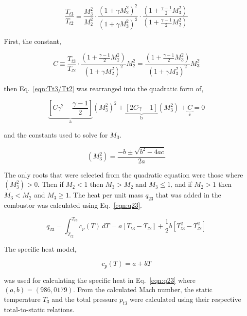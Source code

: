 \documentclass[conf]{new-aiaa} %
\begin{document}
\begin{equation}
    \label{eqn:Tt3/Tt2}
    \frac{T_{t3}}{T_{t2}}=\frac{M_3^2}{M_2^2}\cdot\frac{\left(1+\gamma M_2^2\right)^2}{\left(1+\gamma M_3^2\right)^2}\cdot\frac{\left(1+\frac{\gamma-1}{2}M_3^2\right)}{\left(1+\frac{\gamma-1}{2}M_2^2\right)}
\end{equation}

First, the constant,

\begin{equation}
    \label{eqn:C}
    C\equiv\frac{T_{t3}}{T_{t2}}\cdot\frac{\left(1+\frac{\gamma-1}{2}M_2^2\right)}{\left(1+\gamma M_2^2\right)^2}M_2^2=\frac{\left(1+\frac{\gamma-1}{2}M_3^2\right)}{\left(1+\gamma M_3^2\right)^2}M_3^2
\end{equation}

then Eq.~\eqref{eqn:Tt3/Tt2} was rearranged into the quadratic form of,

\begin{equation}
    \label{eqn:quad}
    \underbrace{\left[C\gamma^2-\frac{\gamma-1}{2}\right]}_\text{a}
    \left(M_3^2\right)^2+
    \underbrace{\left[2C\gamma-1\right]}_\text{b}
    \left(M_3^2\right)+
    \underbrace{C}_\text{c}
    =0
\end{equation}

and the constants used to solve for $M_3$.

\begin{equation}
    \label{eqn:quadeq}
    \left(M_3^2\right)=\frac{-b\pm\sqrt{b^2-4ac}}{2a}
\end{equation}

The only roots that were selected from the quadratic equation were those where $\left(M_3^2\right)>0$. Then if $M_2<1$ then $M_3>M_2$ and $M_3\leq1$, and if $M_2>1$ then $M_3<M_2$ and $M_3\geq1$. The heat per unit mass $q_{23}$ that was added in the combustor was calculated using Eq.~\eqref{eqn:q23}.

\begin{equation}
    \label{eqn:q23}
    q_{23}=\int_{T_{t2}}^{T_{t3}} c_p(T) \,dT=a\left[T_{t3}-T_{t2}\right]+\frac{1}{2}b\left[T_{t3}^2-T_{t2}^2\right]
\end{equation}

The specific heat model,

\begin{equation}
    \label{eqn:latercp}
    c_p (T)=a+bT
\end{equation}

was used for calculating the specific heat in Eq.~\eqref{eqn:q23} where $(a,b)=(986,0179)$. From the calculated Mach number, the static temperature $T_3$ and the total pressure $p_{t3}$ were calculated using their respective total-to-static relations.
\end{document}
